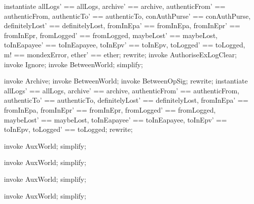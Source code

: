 \begin{LPScript}\begin{zproof}[tBetwAuthoriseExLogClearIsTotal]
    instantiate
      allLogs' == allLogs, archive' == archive,
      authenticFrom' == authenticFrom, authenticTo' == authenticTo,
      conAuthPurse' == conAuthPurse, definitelyLost' == definitelyLost,
      fromInEpa' == fromInEpa, fromInEpr' == fromInEpr,
      fromLogged' == fromLogged, maybeLost' == maybeLost,
      toInEapayee' == toInEapayee, toInEpv' == toInEpv,
      toLogged' == toLogged, m! == mondexError, ether' == ether;
    rewrite;
    invoke AuthoriseExLogClear;
    invoke Ignore;
    invoke \Xi BetweenWorld;
    simplify;
\end{zproof}\end{LPScript}

\begin{LPScript}\begin{zproof}[tBetwArchiveIsTotal]
    invoke Archive;
    invoke \Delta BetweenWorld;
    invoke BetweenOpSig;
    rewrite;
    instantiate allLogs' == allLogs, archive' == archive,
        authenticFrom' == authenticFrom, authenticTo' == authenticTo,
        definitelyLost' == definitelyLost, fromInEpa' == fromInEpa,
        fromInEpr' == fromInEpr, fromLogged' == fromLogged,
        maybeLost' == maybeLost, toInEapayee' == toInEapayee,
        toInEpv' == toInEpv, toLogged' == toLogged;
    rewrite;
\end{zproof}\end{LPScript}

\begin{LPScript}\begin{zproof}[lAuxWorldFromLoggedExpansion]
    invoke AuxWorld;
    simplify;
\end{zproof}\end{LPScript}

\begin{LPScript}\begin{zproof}[lAuxWorldToLoggedExpansion]
    invoke AuxWorld;
    simplify;
\end{zproof}\end{LPScript}

\begin{LPScript}\begin{zproof}[lAuxWorldAuthenticFromExpansion]
    invoke AuxWorld;
    simplify;
\end{zproof}\end{LPScript}

\begin{LPScript}\begin{zproof}[lAuxWorldAuthenticToExpansion]
    invoke AuxWorld;
    simplify;
\end{zproof}\end{LPScript}

